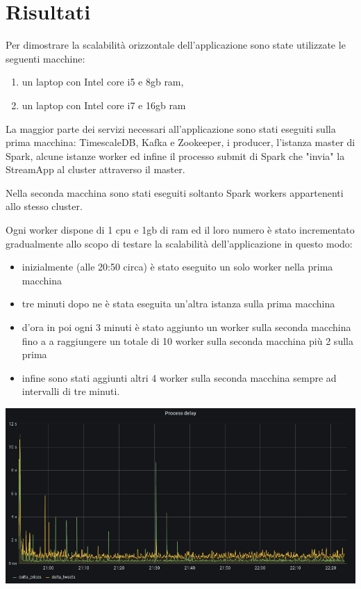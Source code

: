\section{Risultati}

Per dimostrare la scalabilità orizzontale dell'applicazione sono state utilizzate le seguenti
macchine:

\begin{enumerate}
    \item un laptop con Intel core i5 e 8gb ram,
    \item un laptop con Intel core i7 e 16gb ram
\end{enumerate}

La maggior parte dei servizi necessari all'applicazione sono stati eseguiti sulla prima macchina:
TimescaleDB, Kafka e Zookeeper, i producer, l'istanza master di Spark, alcune istanze worker ed
infine il processo submit di Spark che "invia" la StreamApp al cluster attraverso il master.

Nella seconda macchina sono stati eseguiti soltanto Spark workers appartenenti allo stesso cluster.

Ogni worker dispone di 1 cpu e 1gb di ram ed il loro numero è stato incrementato gradualmente
allo scopo di testare la scalabilità dell'applicazione in questo modo:

\begin{itemize}
    \item inizialmente (alle 20:50 circa) è stato eseguito un solo worker nella prima macchina
    \item tre minuti dopo ne è stata eseguita un'altra istanza sulla prima macchina
    \item d'ora in poi ogni 3 minuti è stato aggiunto un worker sulla seconda macchina fino a
          a raggiungere un totale di 10 worker sulla seconda macchina più 2 sulla prima
    \item infine sono stati aggiunti altri 4 worker sulla seconda macchina sempre ad intervalli di
          tre minuti.
\end{itemize}

\begin{center}
    \includegraphics[max width=\linewidth]{process_delay.png}
    \label{processdelay}
\end{center}


